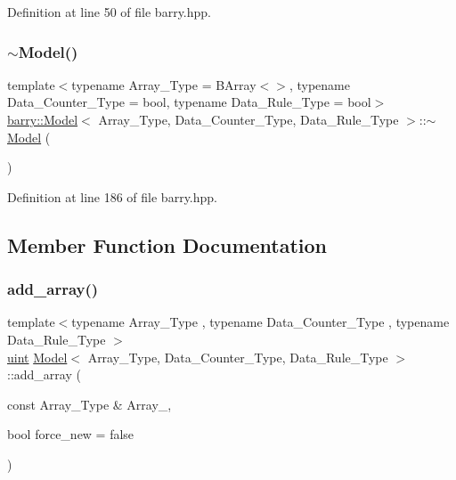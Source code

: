 Definition at line 50 of file barry.\+hpp.

\mbox{\label{classbarry_1_1_model_a2b8617c8bb1b8c76bbaa0f596af0c132}} 
\subsubsection{\texorpdfstring{$\sim$\+Model()}{~Model()}}
{\footnotesize\ttfamily template$<$typename Array\+\_\+\+Type  = B\+Array$<$$>$, typename Data\+\_\+\+Counter\+\_\+\+Type  = bool, typename Data\+\_\+\+Rule\+\_\+\+Type  = bool$>$ \\
\hyperlink{classbarry_1_1_model}{barry\+::\+Model}$<$ Array\+\_\+\+Type, Data\+\_\+\+Counter\+\_\+\+Type, Data\+\_\+\+Rule\+\_\+\+Type $>$\+::$\sim$\hyperlink{classbarry_1_1_model}{Model} (\begin{DoxyParamCaption}{ }\end{DoxyParamCaption})\hspace{0.3cm}{\ttfamily [inline]}}



Definition at line 186 of file barry.\+hpp.



\subsection{Member Function Documentation}
\mbox{\label{classbarry_1_1_model_a17a2205b52c03bb29eefb8fb126a01f6}} 
\subsubsection{\texorpdfstring{add\+\_\+array()}{add\_array()}}
{\footnotesize\ttfamily template$<$typename Array\+\_\+\+Type , typename Data\+\_\+\+Counter\+\_\+\+Type , typename Data\+\_\+\+Rule\+\_\+\+Type $>$ \\
\hyperlink{namespacebarry_a11dfc53ddb4672278319aa04f1e09a6c}{uint} \hyperlink{classbarry_1_1_model}{Model}$<$ Array\+\_\+\+Type, Data\+\_\+\+Counter\+\_\+\+Type, Data\+\_\+\+Rule\+\_\+\+Type $>$\+::add\+\_\+array (\begin{DoxyParamCaption}\item[{const Array\+\_\+\+Type \&}]{Array\+\_\+,  }\item[{bool}]{force\+\_\+new = {\ttfamily false} }\end{DoxyParamCaption})\hspace{0.3cm}{\ttfamily [inline]}}



